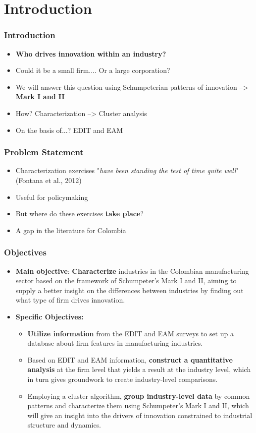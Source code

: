 \documentclass{beamer}
\begin{document}
\section{Introduction}
	\begin{frame}[allowframebreaks]
		\frametitle{Introduction} 
		\begin{itemize}
			\item \textbf{Who drives innovation within an industry?}
			\item Could it be a small firm.... Or a large corporation?
			\item We will answer this question using Schumpeterian patterns of innovation --> \textbf{Mark I and II}
			\item How? Characterization --> Cluster analysis
			\item On the basis of...? EDIT and EAM
		\end{itemize}
	\end{frame}	
	\begin{frame}[allowframebreaks]
		\frametitle{Problem Statement}
		\begin{itemize}
			\item Characterization exercises "\textit{have been standing the test of time quite well}" (Fontana et al., 2012)
			\item Useful for policymaking
			\item But where do these exercises \textbf{take place}? 
			\item A gap in the literature for Colombia
		\end{itemize}
	\end{frame}
	\begin{frame}[allowframebreaks]
		\frametitle{Objectives}
		\begin{itemize}
			\item \textbf{Main objective}: \textbf{Characterize} industries in the Colombian manufacturing sector based on the framework of Schumpeter's Mark I and II, aiming to supply a better insight on the differences between industries by finding out what type of firm drives innovation.
			\framebreak
			\item \textbf{Specific Objectives:}
			\begin{itemize}
				\item \textbf{Utilize information} from the EDIT and EAM surveys to set up a database about firm features in manufacturing industries.
				\item Based on EDIT and EAM information, \textbf{construct a quantitative analysis} at the firm level that yields a result at the industry level, which in turn gives groundwork to create industry-level comparisons.
				\item Employing a cluster algorithm,\textbf{ group industry-level data} by common patterns and characterize them using Schumpeter's Mark I and II, which will give an insight into the drivers of innovation constrained to industrial structure and dynamics.
			\end{itemize}
		\end{itemize}
	\end{frame}
\end{document}
